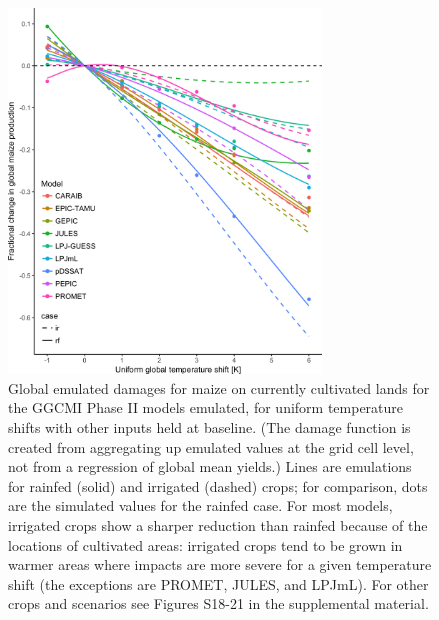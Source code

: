 \documentclass[gmd, manuscript]{copernicus} %
\begin{document}
\begin{figure}[ht]
    \centering
    \includegraphics[width=8.3cm]{figures/global_em_maize.png}
    \caption{Global emulated damages for maize on currently cultivated lands for the GGCMI Phase II models emulated, for uniform temperature shifts with other inputs held at baseline. 
    (The damage function is created from aggregating up emulated values at the grid cell level, not from a regression of global mean yields.) 
    Lines are emulations for rainfed (solid) and irrigated (dashed) crops; for comparison, dots are the simulated values for the rainfed case.  
    For most models, irrigated crops show a sharper reduction than rainfed because of the locations of cultivated areas: irrigated crops tend to be grown in warmer areas where impacts are more severe for a given temperature shift (the exceptions are PROMET, JULES, and LPJmL). 
    For other crops and scenarios see Figures S18-21 in the supplemental material.}
    \label{fig:globe_em}
\end{figure}
\end{document}
